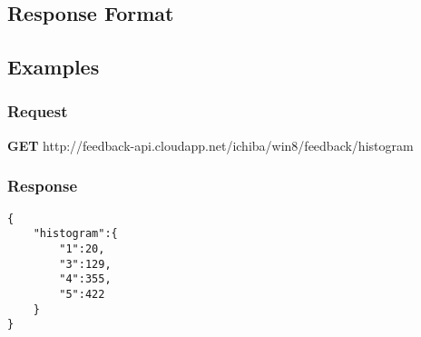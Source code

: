 \subsection{Response Format}

\subsection{Examples}
\subsubsection{Request}
\textbf{GET} http://feedback-api.cloudapp.net/ichiba/win8/feedback/histogram
\subsubsection{Response}
\begin{verbatim}
{
    "histogram":{
        "1":20,
        "3":129,
        "4":355,
        "5":422
    }
}
\end{verbatim}
